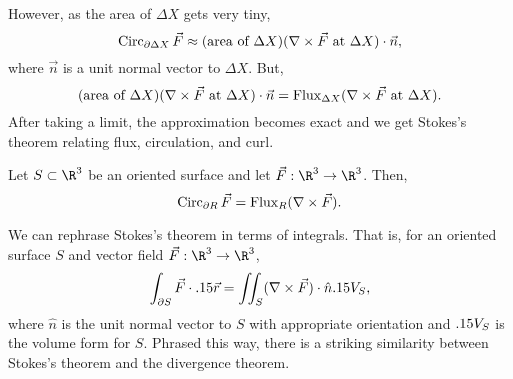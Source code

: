 However, as the area of $\Delta X$ gets very tiny,
\[
	\operatorname{Circ}_{\partial \Delta X} \vec F \approx (\text{area of }\Delta X)(\nabla \times \vec F
	\text{ at }\Delta X)\cdot \vec n,
\]
where $\vec n$ is a unit normal vector to $\Delta X$.  But, 
\[ 
	(\text{area of }\Delta X)(\nabla \times \vec F
	\text{ at }\Delta X)\cdot \vec n = \operatorname{Flux}_{\Delta X}(\nabla \times \vec F\text{ at }\Delta X).
\]
After taking a limit, the approximation becomes exact and we get Stokes's theorem
relating flux, circulation, and curl.

\begin{theorem}
	Let $S\subset \R^3$ be an oriented surface and let $\vec F:\R^3\to\R^3$.  Then,
	\[
		\operatorname{Circ}_{\partial R} \vec F = \operatorname{Flux}_{R}(\nabla \times \vec F).
	\]
\end{theorem}

We can rephrase Stokes's theorem in terms of integrals.  That is, for an oriented
surface $S$ and vector field $\vec F:\R^3\to\R^3$,
\[
	\int_{\partial S} \vec F\cdot .15\vec r = \iint_S (\nabla \times \vec F)\cdot
	\hat n.15 V_S,
\]
where $\hat n$ is the unit normal vector to $S$ with appropriate orientation and 
$.15 V_S$ is the volume form for $S$.  Phrased this way, there is a striking similarity
between Stokes's theorem and the divergence theorem.

